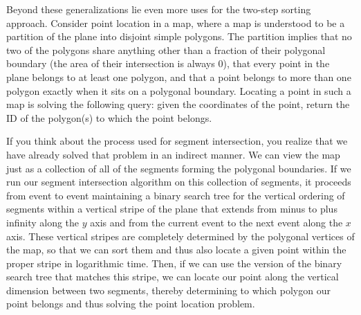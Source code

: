 \documentclass[11pt]{article}
\begin{document}
Beyond these generalizations lie even more uses for the two-step sorting
approach.   Consider point location in a map, where a map is understood
to be a partition of the plane into disjoint simple polygons.  The partition
implies that no two of the polygons share anything other than a fraction of
their polygonal boundary (the area of their intersection is always $0$), that
every point in the plane belongs to at least one polygon, and that a point
belongs to more than one polygon exactly when it sits on a polygonal boundary.
Locating a point in such a map is solving the following query: given the
coordinates of the point, return the ID of the polygon(s) to which the point
belongs.

\newpage
If you think about the process used for segment intersection,
you realize that we have already solved that problem in an indirect manner.
We can view the map just as a collection of all of the segments forming the
polygonal boundaries.  If we run our segment intersection algorithm on this
collection of segments, it proceeds from event to event maintaining a
binary search tree for the vertical ordering of segments within a vertical
stripe of the plane that extends from minus to plus infinity along the $y$ axis
and from the current event to the next event along the $x$ axis.  These vertical
stripes are completely determined by the polygonal vertices of the map, so
that we can sort them and thus also locate a given point within the proper
stripe in logarithmic time.  Then, if we can use the version of the binary
search tree that matches this stripe, we can locate our point along the
vertical dimension between two segments, thereby determining to which
polygon our point belongs and thus solving the point location problem.
\end{document}
